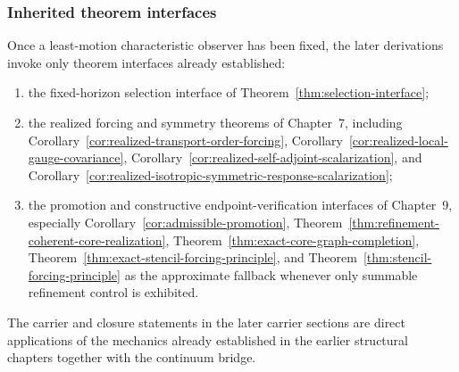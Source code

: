 \subsubsection{Inherited theorem interfaces}

\begin{remark}
\label{rem:part-iv-uses}
Once a least-motion characteristic observer has been fixed, the later
derivations invoke only theorem interfaces already established:
\begin{enumerate}[label=(\roman*), leftmargin=2em, itemsep=0.2em]
\item the fixed-horizon selection interface of
      Theorem~\ref{thm:selection-interface};
\item the realized forcing and symmetry theorems of Chapter~7, including
      Corollary~\ref{cor:realized-transport-order-forcing},
      Corollary~\ref{cor:realized-local-gauge-covariance},
      Corollary~\ref{cor:realized-self-adjoint-scalarization}, and
      Corollary~\ref{cor:realized-isotropic-symmetric-response-scalarization};
\item the promotion and constructive endpoint-verification interfaces of
      Chapter~9, especially Corollary~\ref{cor:admissible-promotion},
      Theorem~\ref{thm:refinement-coherent-core-realization},
      Theorem~\ref{thm:exact-core-graph-completion},
      Theorem~\ref{thm:exact-stencil-forcing-principle}, and
      Theorem~\ref{thm:stencil-forcing-principle} as the approximate fallback
      whenever only summable refinement control is exhibited.
\end{enumerate}
The carrier and closure statements in the later carrier sections are direct
applications of the mechanics already established in the earlier structural
chapters together with the continuum bridge.
\end{remark}

